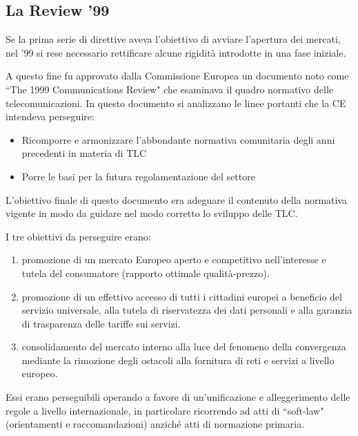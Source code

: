 \subsection{La Review '99}

Se la prima serie di direttive aveva l'obiettivo di avviare l'apertura dei mercati, nel '99 si rese necessario rettificare alcune rigidità introdotte in una fase iniziale.

A questo fine fu approvato dalla Commissione Europea un documento noto come ``The 1999 Communications Review" che esaminava il quadro normativo delle telecomunicazioni. 
In questo documento si analizzano le linee portanti che la CE intendeva perseguire:
\begin{itemize}
    \item Ricomporre e armonizzare l'abbondante normativa comunitaria degli anni precedenti in materia di TLC
    \item Porre le basi per la futura regolamentazione del settore
\end{itemize}

L'obiettivo finale di questo documento era adeguare il contenuto della normativa vigente in modo da guidare nel modo corretto lo sviluppo delle TLC.


I tre obiettivi da perseguire erano:
\begin{enumerate}
    \item promozione di un mercato Europeo aperto e competitivo nell'interesse e tutela del consumatore (rapporto ottimale qualità-prezzo).
    \item promozione di un effettivo accesso di tutti i cittadini europei a beneficio del servizio universale, alla tutela di riservatezza dei dati personali e alla garanzia di trasparenza delle tariffe sui servizi.
    \item consolidamento del mercato interno alla luce del fenomeno della convergenza mediante la rimozione degli ostacoli alla fornitura di reti e servizi a livello europeo.
\end{enumerate}

Essi erano perseguibili operando a favore di un'unificazione e alleggerimento delle regole a livello internazionale, in particolare ricorrendo ad atti di ``soft-law" (orientamenti e raccomandazioni) anziché atti di normazione primaria.

